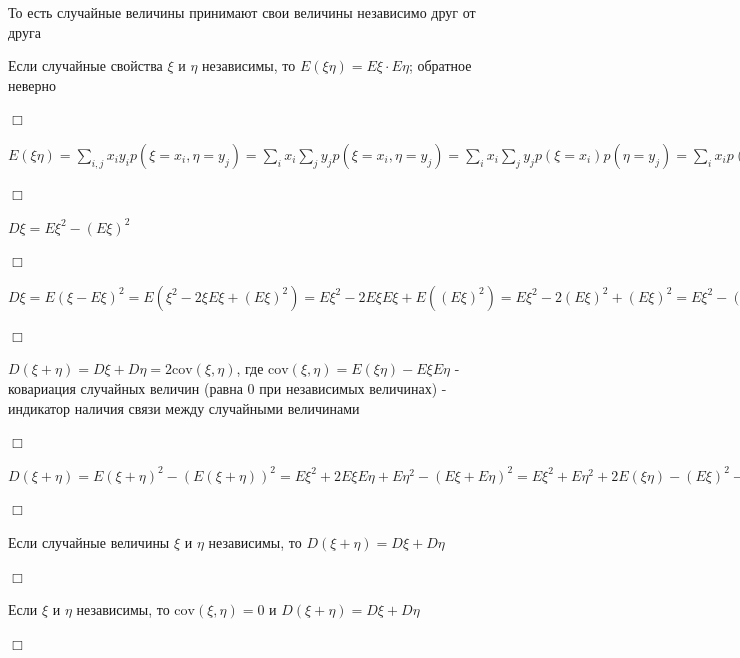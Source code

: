 \documentclass[12pt]{article}
\begin{document}
    То есть случайные величины принимают свои величины независимо друг от друга

     Если случайные свойства $\xi$ и $\eta$ независимы, то $E(\xi \eta) = E\xi \cdot E\eta$; обратное неверно

    \begin{MyProof}
        $\Box$

        $E(\xi\eta) = \sum_{i, j} x_i y_i p(\xi = x_i, \eta = y_j) = \sum_i x_i \sum_j y_j p(\xi = x_i, \eta = y_j) =
        \sum_i x_i \sum_j y_j p(\xi = x_i) p(\eta = y_j) = \sum_i x_i p(\xi = x_i) \sum_j y_j p(\eta = y_j) = E\xi \cdot E\eta$

        $\Box$
    \end{MyProof}

     $D\xi = E\xi^2 - (E\xi)^2$

    \begin{MyProof}
        $\Box$

        $D\xi = E(\xi - E\xi)^2 = E(\xi^2 - 2\xi E\xi + (E\xi)^2) = E\xi^2 - 2E\xi E\xi + E((E\xi)^2) =
        E\xi^2 - 2(E\xi)^2 + (E\xi)^2 = E\xi^2 - (E\xi)^2$

        $\Box$
    \end{MyProof}

     $D(\xi + \eta) = D\xi + D\eta = 2\mathrm{cov} (\xi, \eta)$,
    где $\mathrm{cov}(\xi, \eta) = E(\xi\eta) - E\xi E\eta$ - ковариация случайных величин (равна 0 при независимых величинах) - индикатор наличия связи между случайными величинами

    \begin{MyProof}
        $\Box$

    $D(\xi + \eta) = E(\xi + \eta)^2 - (E(\xi + \eta))^2 = E\xi^2 + 2E\xi E\eta + E\eta^2 - (E\xi + E\eta)^2 =
    E\xi^2 + E\eta^2 + 2E(\xi\eta) - (E\xi)^2 - (E\eta)^2 - 2E\xi E\eta = D\xi + D\eta + 2\mathrm{cov}(\xi, \eta)$

        $\Box$
    \end{MyProof}


     Если случайные величины $\xi$ и $\eta$ независимы, то $D(\xi + \eta) = D\xi + D\eta$

    \begin{MyProof}
        $\Box$

        Если $\xi$ и $\eta$ независимы, то $\mathrm{cov}(\xi, \eta) = 0$ и $D(\xi + \eta) = D\xi + D\eta$

        $\Box$
    \end{MyProof}
\end{document}
